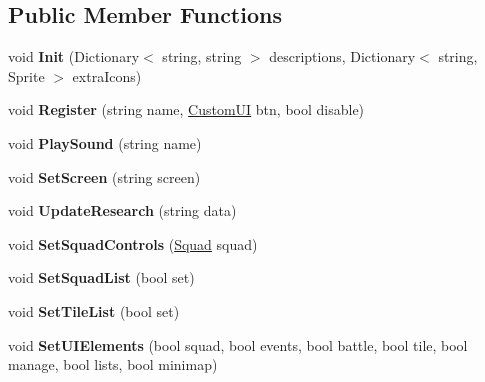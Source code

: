 \subsection*{Public Member Functions}
\begin{DoxyCompactItemize}
\item 
\hypertarget{class_g_u_i_manager_a6cd45c6a4f1db54ec57290b2a44e5c3e}{}void {\bfseries Init} (Dictionary$<$ string, string $>$ descriptions, Dictionary$<$ string, Sprite $>$ extra\+Icons)\label{class_g_u_i_manager_a6cd45c6a4f1db54ec57290b2a44e5c3e}

\item 
\hypertarget{class_g_u_i_manager_aabe66c63d8fdf23332cc69e2105a4acc}{}void {\bfseries Register} (string name, \hyperlink{class_custom_u_i}{Custom\+U\+I} btn, bool disable)\label{class_g_u_i_manager_aabe66c63d8fdf23332cc69e2105a4acc}

\item 
\hypertarget{class_g_u_i_manager_a6a656d92e174acf9d1a957284ef99cf0}{}void {\bfseries Play\+Sound} (string name)\label{class_g_u_i_manager_a6a656d92e174acf9d1a957284ef99cf0}

\item 
\hypertarget{class_g_u_i_manager_a9b68de1231a706a74b4a42a04436031a}{}void {\bfseries Set\+Screen} (string screen)\label{class_g_u_i_manager_a9b68de1231a706a74b4a42a04436031a}

\item 
\hypertarget{class_g_u_i_manager_a750b6e4684687e5c220d63392ea8f40c}{}void {\bfseries Update\+Research} (string data)\label{class_g_u_i_manager_a750b6e4684687e5c220d63392ea8f40c}

\item 
\hypertarget{class_g_u_i_manager_a77577dd9c73e0f55379663790e34b671}{}void {\bfseries Set\+Squad\+Controls} (\hyperlink{class_squad}{Squad} squad)\label{class_g_u_i_manager_a77577dd9c73e0f55379663790e34b671}

\item 
\hypertarget{class_g_u_i_manager_aa2355d0c1d9581bab63e2183e68e8d7e}{}void {\bfseries Set\+Squad\+List} (bool set)\label{class_g_u_i_manager_aa2355d0c1d9581bab63e2183e68e8d7e}

\item 
\hypertarget{class_g_u_i_manager_a16f4bc785e0d9691c33571e99f7110bb}{}void {\bfseries Set\+Tile\+List} (bool set)\label{class_g_u_i_manager_a16f4bc785e0d9691c33571e99f7110bb}

\item 
\hypertarget{class_g_u_i_manager_a69b3f30ce389245508e0d267e19b0b18}{}void {\bfseries Set\+U\+I\+Elements} (bool squad, bool events, bool battle, bool tile, bool manage, bool lists, bool minimap)\label{class_g_u_i_manager_a69b3f30ce389245508e0d267e19b0b18}


\end{DoxyCompactItemize}
